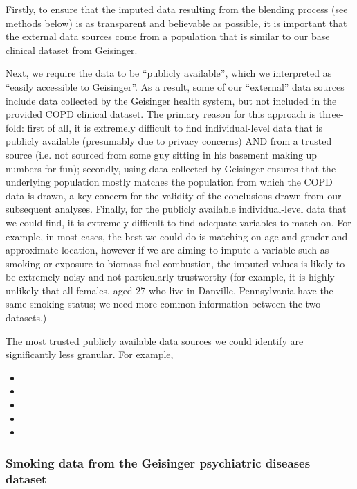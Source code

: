 \documentclass{article}
\begin{document}
Firstly, to ensure that the imputed data resulting from the blending process (see methods below) is as transparent and believable as possible, it is important that the external data sources come from a population that is similar to our base clinical dataset from Geisinger.  

Next, we require the data to be ``publicly available'', which we interpreted as ``easily accessible to Geisinger''. As a result, some of our ``external'' data sources include data collected by the Geisinger health system, but not included in the provided COPD clinical dataset. The primary reason for this approach is three-fold: first of all, it is extremely difficult to find individual-level data that is publicly available (presumably due to privacy concerns) AND from a trusted source (i.e. not sourced from some guy sitting in his basement making up numbers for fun); secondly, using data collected by Geisinger ensures that the underlying population mostly matches the population from which the COPD data is drawn, a key concern for the validity of the conclusions drawn from our subsequent analyses. Finally, for the publicly available individual-level data that we could find, it is extremely difficult to find adequate variables to match on. For example, in most cases, the best we could do is matching on age and gender and approximate location, however if we are aiming to impute a variable such as smoking or exposure to biomass fuel combustion, the imputed values is likely to be extremely noisy and not particularly trustworthy (for example, it is highly unlikely that all females, aged 27 who live in Danville, Pennsylvania have the same smoking status; we need more common information between the two datasets.)

The most trusted publicly available data sources we could identify are significantly less granular. For example, 

\begin{itemize}
  \item 
  \item 
  \item 
  \item 
  \item 
\end{itemize}


\subsubsection{Smoking data from the Geisinger psychiatric diseases dataset}
\end{document}
